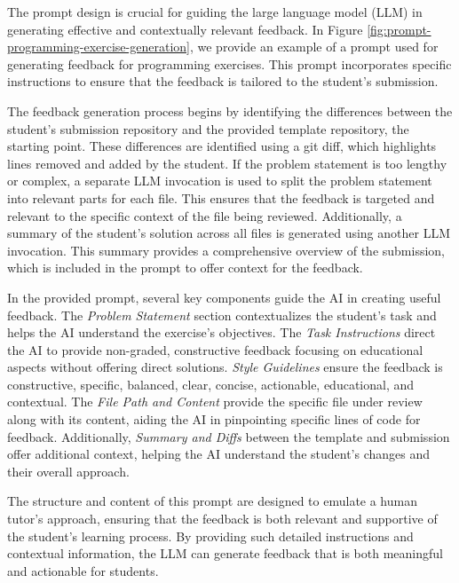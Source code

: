 \documentclass[manuscript,screen,review]{acmart}
\begin{document}
The prompt design is crucial for guiding the large language model (LLM) in generating effective and contextually relevant feedback. 
In Figure \ref{fig:prompt-programming-exercise-generation}, we provide an example of a prompt used for generating feedback for programming exercises. 
This prompt incorporates specific instructions to ensure that the feedback is tailored to the student's submission.

The feedback generation process begins by identifying the differences between the student's submission repository and the provided template repository, the starting point. 
These differences are identified using a git diff, which highlights lines removed and added by the student. 
If the problem statement is too lengthy or complex, a separate LLM invocation is used to split the problem statement into relevant parts for each file. 
This ensures that the feedback is targeted and relevant to the specific context of the file being reviewed. 
Additionally, a summary of the student's solution across all files is generated using another LLM invocation. 
This summary provides a comprehensive overview of the submission, which is included in the prompt to offer context for the feedback.

In the provided prompt, several key components guide the AI in creating useful feedback. The \textit{Problem Statement} section contextualizes the student's task and helps the AI understand the exercise's objectives.
The \textit{Task Instructions} direct the AI to provide non-graded, constructive feedback focusing on educational aspects without offering direct solutions.
\textit{Style Guidelines} ensure the feedback is constructive, specific, balanced, clear, concise, actionable, educational, and contextual.
The \textit{File Path and Content} provide the specific file under review along with its content, aiding the AI in pinpointing specific lines of code for feedback.
Additionally, \textit{Summary and Diffs} between the template and submission offer additional context, helping the AI understand the student's changes and their overall approach.

The structure and content of this prompt are designed to emulate a human tutor's approach, ensuring that the feedback is both relevant and supportive of the student's learning process.
By providing such detailed instructions and contextual information, the LLM can generate feedback that is both meaningful and actionable for students.
\end{document}
